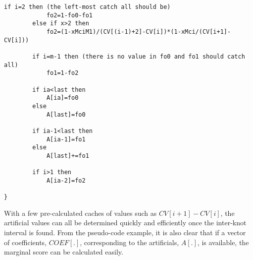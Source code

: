 \documentclass[10pt]{article}
\begin{document}
\begin{Verbatim}[fontsize=\small,baselinestretch=0.75,formatcom=\color{red}]
        if i=2 then (the left-most catch all should be)
            fo2=1-fo0-fo1
        else if x>2 then 
            fo2=(1-xMciM1)/(CV[(i-1)+2]-CV[i])*(1-xMci/(CV[i+1]-CV[i]))

        if i=m-1 then (there is no value in fo0 and fo1 should catch all)
            fo1=1-fo2

        if ia<last then
            A[ia]=fo0
        else
            A[last]=fo0

        if ia-1<last then
            A[ia-1]=fo1
        else
            A[last]+=fo1

        if i>1 then
            A[ia-2]=fo2

}
\end{Verbatim}
With a few pre-calculated caches of values such as $CV[i+1]-CV[i]$, the artificial values can all be determined
quickly and efficiently once the inter-knot interval is found.  From the pseudo-code example, it is also 
clear that if a vector of coefficients, $COEF[.]$, corresponding to the artificials, $A[.]$, is available,
the marginal score can be calculated easily.




















%
%

%
%
\end{document}
